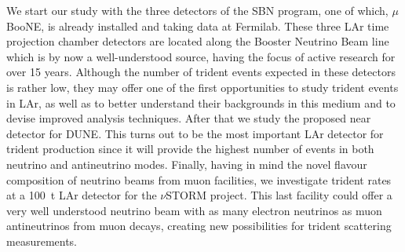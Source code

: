 We start our study with the three detectors of the SBN program, one of which, $\mu$BooNE, is already installed and taking data at Fermilab. These three LAr time projection chamber detectors are located along the Booster Neutrino Beam line which is by now a well-understood source, having the focus of active research for over 15 years. 
%
Although the number of trident events expected in these detectors is rather low, they may offer one of the first opportunities to study trident events in LAr, as well as to better understand their backgrounds in this medium and to devise improved analysis techniques.
%
After that we study the proposed near detector for DUNE. This turns out to be the most important LAr detector for trident production since it will provide the highest number of events in both neutrino and antineutrino modes. 
%
Finally, having in mind the novel flavour composition of neutrino beams from muon facilities, we investigate trident rates at a 100~t LAr detector for the $\nu$STORM project. This last facility could offer a very well understood neutrino beam with as many electron neutrinos as muon antineutrinos from muon decays, creating new possibilities for trident scattering measurements.
\begin{table}[t]
\begin{center}
\end{center}
\caption{\label{tab:LAr} Summary of the LAr detectors set-up and values assumed in our calculations.
The POT numbers are given for a neutrino (antineutrino) beam.}
\end{table}

